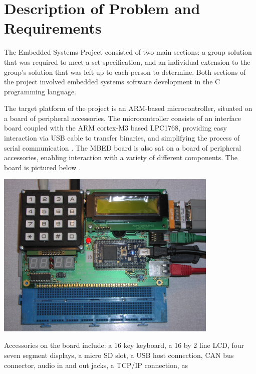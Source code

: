 

\section{Description of Problem and Requirements}



The Embedded Systems Project consisted of two main sections: a group solution 
that was required to meet a set specification, and an individual extension to 
the group's solution that was left up to each person to determine. 
Both sections of the project involved embedded systems software development in 
the C programming language. 
\par\bigskip\noindent
The target platform of the project is an ARM-based microcontroller, 
situated on a board of peripheral accessories. 
The microcontroller consists of 
an interface board coupled with the ARM cortex-M3 based LPC1768, providing easy 
interaction via USB cable to transfer binaries, and simplifying the process of 
serial communication \cite{how-mbed-works}.
The MBED board is also sat on a board of peripheral accessories, enabling 
interaction with a variety of different components. 
The board is pictured below
\cite{mbed-picture}.
\begin{center}
\includegraphics[width=0.80\textwidth]{./mbed_board}
\end{center}
Accessories on the board include: a 16 key keyboard, 
a 16 by 2 line LCD, four seven segment displays, a micro SD slot, a USB host 
connection, CAN bus connector, audio in and out jacks, a TCP/IP connection, as 
